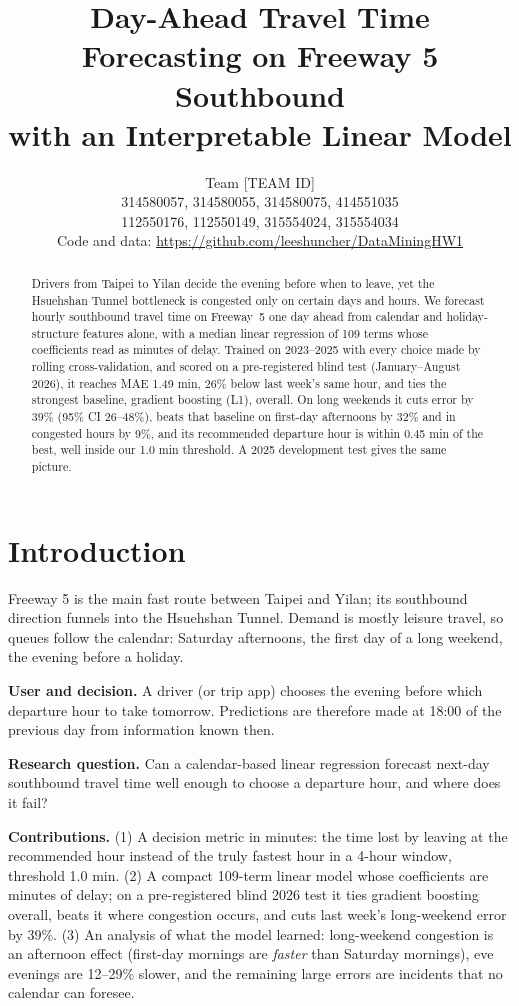 \documentclass[11pt]{article}
\title{Day-Ahead Travel Time Forecasting on Freeway 5 Southbound\\with an Interpretable Linear Model}
\author{Team [TEAM ID]\\
\normalfont\small \zh{李尚哲} 314580057, \zh{呂丞頤} 314580055, \zh{黃駿甯} 314580075, \zh{吳美真} 414551035\\
\normalfont\small \zh{孫傅康} 112550176, \zh{傅維雨} 112550149, \zh{張凱華} 315554024, \zh{李玠廷} 315554034\\
Code and data: \url{https://github.com/leeshuncher/DataMiningHW1}}
\begin{document}
\maketitle
\begin{abstract}
Drivers from Taipei to Yilan decide the evening before when to leave, yet the Hsuehshan Tunnel bottleneck is congested only on certain days and hours. We forecast hourly southbound travel time on Freeway~5 one day ahead from calendar and holiday-structure features alone, with a median linear regression of 109 terms whose coefficients read as minutes of delay. Trained on 2023--2025 with every choice made by rolling cross-validation, and scored on a pre-registered blind test (January--August 2026), it reaches MAE 1.49 min, 26\% below last week's same hour, and ties the strongest baseline, gradient boosting (L1), overall. On long weekends it cuts error by 39\% (95\% CI 26--48\%), beats that baseline on first-day afternoons by 32\% and in congested hours by 9\%, and its recommended departure hour is within 0.45 min of the best, well inside our 1.0 min threshold. A 2025 development test gives the same picture.
\end{abstract}

\section{Introduction}
Freeway 5 is the main fast route between Taipei and Yilan; its southbound direction funnels into the Hsuehshan Tunnel. Demand is mostly leisure travel, so queues follow the calendar: Saturday afternoons, the first day of a long weekend, the evening before a holiday.

\noindent\textbf{User and decision.} A driver (or trip app) chooses the evening before which departure hour to take tomorrow. Predictions are therefore made at 18:00 of the previous day from information known then.

\noindent\textbf{Research question.} Can a calendar-based linear regression forecast next-day southbound travel time well enough to choose a departure hour, and where does it fail?

\noindent\textbf{Contributions.} (1) A decision metric in minutes: the time lost by leaving at the recommended hour instead of the truly fastest hour in a 4-hour window, threshold 1.0 min. (2) A compact 109-term linear model whose coefficients are minutes of delay; on a pre-registered blind 2026 test it ties gradient boosting overall, beats it where congestion occurs, and cuts last week's long-weekend error by 39\%. (3) An analysis of what the model learned: long-weekend congestion is an afternoon effect (first-day mornings are \emph{faster} than Saturday mornings), eve evenings are 12--29\% slower, and the remaining large errors are incidents that no calendar can foresee.
\end{document}

